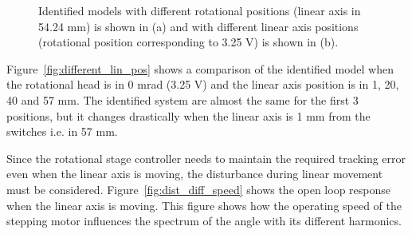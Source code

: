 \begin{figure}[h!]
  \centering %
  \qquad
  \caption{\label{fig:different_lin_angle} Identified models with different rotational positions (linear axis in 54.24 mm) is shown in (a) and with different linear axis positions (rotational position corresponding to 3.25 V) is shown in (b).}
\end{figure}

Figure~\ref{fig:different_lin_pos} shows a comparison of the identified model when the rotational head is in 0 mrad (3.25 V) and the linear axis position is in 1, 20, 40 and 57 mm. The identified system are almost the same for the first 3 positions, but it changes drastically when the linear axis is 1 mm from the switches i.e. in 57 mm.

Since the rotational stage controller needs to maintain the required tracking error even when the linear axis is moving, the disturbance during linear movement must be considered. Figure~\ref{fig:dist_diff_speed} shows the open loop response when the linear axis is moving. This figure shows how the operating speed of the stepping motor influences the spectrum of the angle with its different harmonics.

